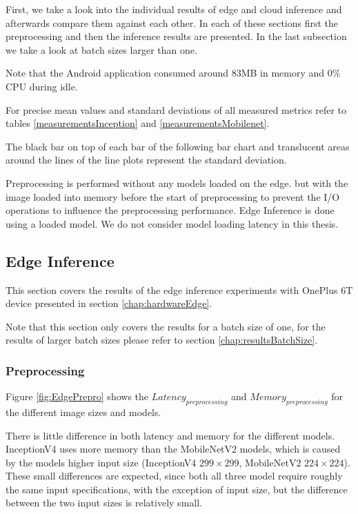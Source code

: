 First, we take a look into the individual results of edge and cloud inference and afterwards compare them against each other. In each of these sections first the preprocessing and then the inference results are presented. 
In the last subsection we take a look at batch sizes larger than one.

Note that the Android application consumed around 83MB in memory and 0\% CPU during idle.

For precise mean values and standard deviations of all measured metrics refer to tables \ref{measurementsInception} and \ref{measurementsMobilenet}.

The black bar on top of each bar of the following bar chart and translucent areas around the lines of the line plots represent the standard deviation.

Preprocessing is performed without any models loaded on the edge. but with the image loaded into memory before the start of preprocessing to prevent the I/O operations to influence the preprocessing performance.
Edge Inference is done using a loaded model. We do not consider model loading latency in this thesis.
\subsection{Edge Inference}
This section covers the results of the edge inference experiments with OnePlus 6T device presented in section \ref{chap:hardwareEdge}.

Note that this section only covers the results for a batch size of one, for the results of larger batch sizes please refer to section \ref{chap:resultsBatchSize}.
\subsubsection{Preprocessing}
\label{chap:edgePrepro}
Figure \ref{fig:EdgePrepro} shows the $Latency_{preprocessing}$ and $Memory_{preprocessing}$ for the different image sizes and models.

There is little difference in both latency and memory for the different models. 
InceptionV4 uses more memory than the MobileNetV2 models, which is caused by the models higher input size (InceptionV4 $299\times299$, MobileNetV2 $224\times224$). 
These small differences are expected, since both all three model require roughly the same input specifications, with the exception of input size, but the difference between the two input sizes is relatively small.

